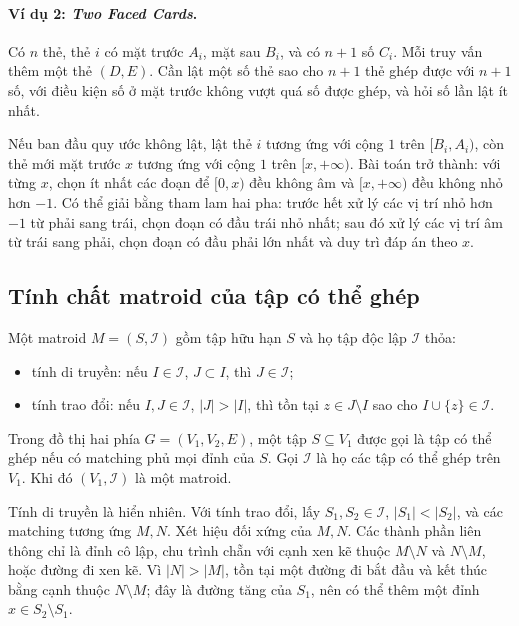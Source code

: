 \documentclass[11pt]{article}
\begin{document}
\paragraph{Ví dụ 2: \emph{Two Faced Cards}.}
Có \(n\) thẻ, thẻ \(i\) có mặt trước \(A_i\), mặt sau \(B_i\), và có \(n+1\)
số \(C_i\). Mỗi truy vấn thêm một thẻ \((D,E)\). Cần lật một số thẻ sao cho
\(n+1\) thẻ ghép được với \(n+1\) số, với điều kiện số ở mặt trước không vượt
quá số được ghép, và hỏi số lần lật ít nhất.

Nếu ban đầu quy ước không lật, lật thẻ \(i\) tương ứng với cộng \(1\) trên
\([B_i,A_i)\), còn thẻ mới mặt trước \(x\) tương ứng với cộng \(1\) trên
\([x,+\infty)\). Bài toán trở thành: với từng \(x\), chọn ít nhất các đoạn để
\([0,x)\) đều không âm và \([x,+\infty)\) đều không nhỏ hơn \(-1\). Có thể giải
bằng tham lam hai pha: trước hết xử lý các vị trí nhỏ hơn \(-1\) từ phải sang
trái, chọn đoạn có đầu trái nhỏ nhất; sau đó xử lý các vị trí âm từ trái sang
phải, chọn đoạn có đầu phải lớn nhất và duy trì đáp án theo \(x\).

\subsection{Tính chất matroid của tập có thể ghép}

Một matroid \(M=(S,\mathcal I)\) gồm tập hữu hạn \(S\) và họ tập độc lập
\(\mathcal I\) thỏa:
\begin{itemize}
  \item tính di truyền: nếu \(I\in\mathcal I\), \(J\subset I\), thì
  \(J\in\mathcal I\);
  \item tính trao đổi: nếu \(I,J\in\mathcal I\), \(|J|>|I|\), thì tồn tại
  \(z\in J\setminus I\) sao cho \(I\cup\{z\}\in\mathcal I\).
\end{itemize}

Trong đồ thị hai phía \(G=(V_1,V_2,E)\), một tập \(S\subseteq V_1\) được gọi là
tập có thể ghép nếu có matching phủ mọi đỉnh của \(S\). Gọi \(\mathcal I\) là
họ các tập có thể ghép trên \(V_1\). Khi đó \((V_1,\mathcal I)\) là một
matroid.

Tính di truyền là hiển nhiên. Với tính trao đổi, lấy
\(S_1,S_2\in\mathcal I\), \(|S_1|<|S_2|\), và các matching tương ứng \(M,N\).
Xét hiệu đối xứng của \(M,N\). Các thành phần liên thông chỉ là đỉnh cô lập,
chu trình chẵn với cạnh xen kẽ thuộc \(M\setminus N\) và \(N\setminus M\), hoặc
đường đi xen kẽ. Vì \(|N|>|M|\), tồn tại một đường đi bắt đầu và kết thúc bằng
cạnh thuộc \(N\setminus M\); đây là đường tăng của \(S_1\), nên có thể thêm một
đỉnh \(x\in S_2\setminus S_1\).
\end{document}
